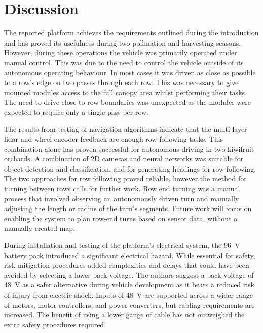 \documentclass[preprint,authoryear,12pt]{elsarticle}
\begin{document}


\section{Discussion}
\label{sect:discussion}

    The reported platform achieves the requirements outlined during the introduction and has proved its usefulness during two pollination and harvesting seasons.
    However, during these operations the vehicle was primarily operated under manual control.
    This was due to the need to control the vehicle outside of its autonomous operating behaviour.
    In most cases it was driven as close as possible to a row's edge on two passes through each row.
    This was necessary to give mounted modules access to the full canopy area whilst performing their tasks.
    The need to drive close to row boundaries was unexpected as the modules were expected to require only a single pass per row.

    The results from testing of navigation algorithms indicate that the multi-layer lidar and wheel encoder feedback are enough row following tasks.
    This combination alone has proven successful for autonomous driving in two kiwifruit orchards.
    A combination of 2D cameras and neural networks was suitable for object detection and classification, and for generating headings for row following.
    The two approaches for row following proved reliable, however the method for turning between rows calls for further work.
    Row end turning was a manual process that involved observing an autonomously driven turn and manually adjusting the length or radius of the turn's segments.
    Future work will focus on enabling the system to plan row-end turns based on sensor data, without a manually created map.

    During installation and testing of the platform's electrical system, the \SI{96}{\volt} battery pack introduced a significant electrical hazard.
    While essential for safety, risk mitigation procedures added complexities and delays that could have been avoided by selecting a lower pack voltage.
    The authors suggest a pack voltage of \SI{48}{\volt} as a safer alternative during vehicle development as it bears a reduced risk of injury from electric shock.
    Inputs of \SI{48}{\volt} are supported across a wider range of motors, motor controllers, and power converters, but cabling requirements are increased.
    The benefit of using a lower gauge of cable has not outweighed the extra safety procedures required.
\end{document}
